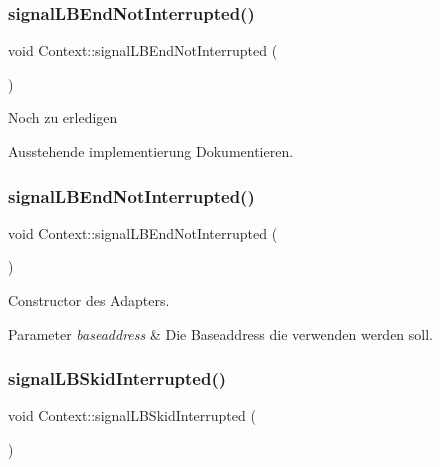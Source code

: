\subsubsection{\texorpdfstring{signal\+L\+B\+End\+Not\+Interrupted()}{signalLBEndNotInterrupted()}\hspace{0.1cm}{\footnotesize\ttfamily [1/2]}}
{\footnotesize\ttfamily void Context\+::signal\+L\+B\+End\+Not\+Interrupted (\begin{DoxyParamCaption}{ }\end{DoxyParamCaption})}

\begin{DoxyRefDesc}{Noch zu erledigen}
\item[\hyperlink{todo__todo000006}{Noch zu erledigen}]Ausstehende implementierung Dokumentieren. \end{DoxyRefDesc}
\hypertarget{class_context_a6debf81836f13909119658b40e32fe1c}{}\label{class_context_a6debf81836f13909119658b40e32fe1c} 
\subsubsection{\texorpdfstring{signal\+L\+B\+End\+Not\+Interrupted()}{signalLBEndNotInterrupted()}\hspace{0.1cm}{\footnotesize\ttfamily [2/2]}}
{\footnotesize\ttfamily void Context\+::signal\+L\+B\+End\+Not\+Interrupted (\begin{DoxyParamCaption}{ }\end{DoxyParamCaption})}

Constructor des Adapters.


\begin{DoxyParams}{Parameter}
{\em baseaddress} & Die Baseaddress die verwenden werden soll. \\
\hline
\end{DoxyParams}
\hypertarget{class_context_a41c95a05dffe3e6d89ebe5a6522e3a6a}{}\label{class_context_a41c95a05dffe3e6d89ebe5a6522e3a6a} 
\subsubsection{\texorpdfstring{signal\+L\+B\+Skid\+Interrupted()}{signalLBSkidInterrupted()}\hspace{0.1cm}{\footnotesize\ttfamily [1/2]}}
{\footnotesize\ttfamily void Context\+::signal\+L\+B\+Skid\+Interrupted (\begin{DoxyParamCaption}{ }\end{DoxyParamCaption})}

